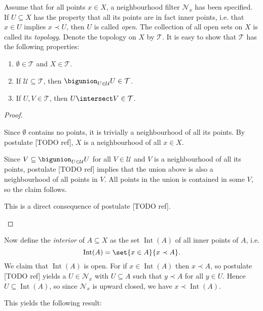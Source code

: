 \documentclass[article, a4paper, 11pt, oneside]{memoir}
\numberwithin{equation}{chapter}
\newcommand{\calT}{\mathcal{T}}
\newcommand{\calU}{\mathcal{U}}
\newcommand{\inpoint}{\prec}
\newcommand{\calN}{\mathcal{N}}
\newcommand{\nhoods}[1]{\calN_{#1}}
\renewcommand{\interior}[1]{\operatorname{Int}(#1)}
\begin{document}
Assume that for all points $x \in X$, a neighbourhood filter $\nhoods{x}$ has been specified. If $U \subseteq X$ has the property that all its points are in fact inner points, i.e. that $x \in U$ implies $x \inpoint U$, then $U$ is called \emph{open}. The collection of all open sets on $X$ is called its \emph{topology}. Denote the topology on $X$ by $\calT$. It is easy to show that $\calT$ has the following properties:
%
\begin{enumerate}
    \item $\emptyset \in \calT$ and $X \in \calT$.
    \item If $\calU \subseteq \calT$, then $\bigunion_{U \in \calU} U \in \calT$.
    \item If $U,V \in \calT$, then $U \intersect V \in \calT$.
\end{enumerate}

\begin{proof}
\begin{proofsec}
    \item[Proof of (1)]
    Since $\emptyset$ contains no points, it is trivially a neighbourhood of all its points. By postulate [TODO ref], $X$ is a neighbourhood of all $x \in X$.

    \item[Proof of (2)]
    Since $V \subseteq \bigunion_{U \in \calU} U$ for all $V \in \calU$ and $V$ is a neighbourhood of all its points, postulate [TODO ref] implies that the union above is also a neighbourhood of all points in $V$. All points in the union is contained in some $V$, so the claim follows.

    \item[Proof of (3)]
    This is a direct consequence of postulate [TODO ref].
\end{proofsec}
\end{proof}

Now define the \emph{interior} of $A \subseteq X$ as the set $\interior{A}$ of all inner points of $A$, i.e.
%
\begin{equation*}
    \interior{A}
        = \set{x \in A}{x \inpoint A}.
\end{equation*}
%
We claim that $\interior{A}$ is open. For if $x \in \interior{A}$ then $x \inpoint A$, so postulate [TODO ref] yields a $U \in \nhoods{x}$ with $U \subseteq A$ such that $y \inpoint A$ for all $y \in U$. Hence $U \subseteq \interior{A}$, so since $\nhoods{x}$ is upward closed, we have $x \inpoint \interior{A}$.

This yields the following result:
\end{document}
